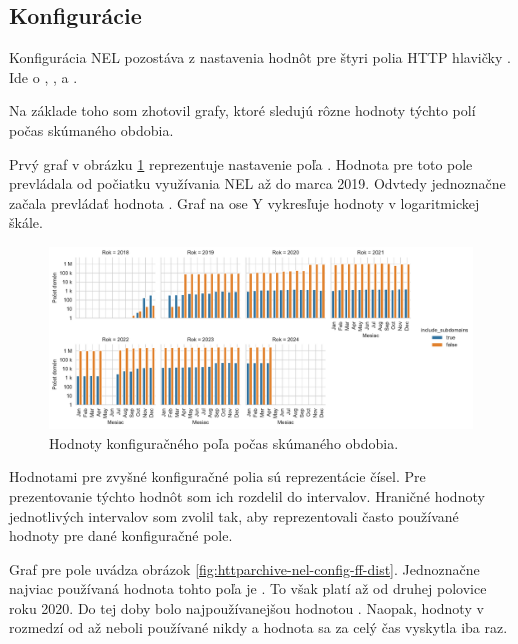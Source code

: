 \pagebreak

\subsection{Konfigurácie}

Konfigurácia NEL pozostáva z nastavenia hodnôt pre štyri polia HTTP hlavičky . Ide o , ,  a .

Na základe toho som zhotovil grafy, ktoré sledujú rôzne hodnoty týchto polí počas skúmaného obdobia.

Prvý graf v obrázku \ref{fig:httparchive-nel-config-is-dist} reprezentuje nastavenie poľa .
Hodnota  pre toto pole prevládala od počiatku využívania NEL až do marca 2019.
Odvtedy jednoznačne začala prevládať hodnota .
Graf na ose Y vykresľuje hodnoty v logaritmickej škále.

\begin{figure}[!htb]
\begin{center}
 \includegraphics[scale=0.525]{obrazky-figures/httparchive_nel_config_is_dist.pdf}
 \caption{Hodnoty konfiguračného poľa  počas skúmaného obdobia.}
 \label{fig:httparchive-nel-config-is-dist}
\end{center}
\end{figure}

\pagebreak

Hodnotami pre zvyšné konfiguračné polia sú reprezentácie čísel.
Pre prezentovanie týchto hodnôt som ich rozdelil do intervalov.
Hraničné hodnoty jednotlivých intervalov som zvolil tak, aby reprezentovali často používané hodnoty pre dané konfiguračné pole.

Graf pre pole  uvádza obrázok \ref{fig:httparchive-nel-config-ff-dist}.
Jednoznačne najviac používaná hodnota tohto poľa je .
To však platí až od druhej polovice roku 2020. 
Do tej doby bolo najpoužívanejšou hodnotou .
Naopak, hodnoty v rozmedzí od  až  neboli používané nikdy a hodnota  sa za celý čas vyskytla iba raz.

